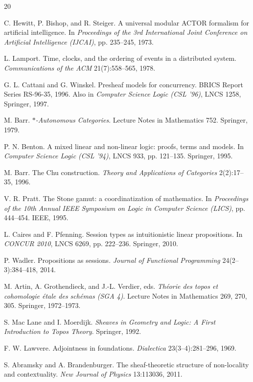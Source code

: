 \documentclass[11pt]{article}
\begin{document}
\begin{thebibliography}{20}
\raggedright

C. Hewitt, P. Bishop, and R. Steiger.
A universal modular ACTOR formalism for artificial intelligence.
In \emph{Proceedings of the 3rd International Joint Conference on Artificial
Intelligence (IJCAI)}, pp. 235--245, 1973.

L. Lamport.
Time, clocks, and the ordering of events in a distributed system.
\emph{Communications of the ACM} 21(7):558--565, 1978.

G. L. Cattani and G. Winskel.
Presheaf models for concurrency.
BRICS Report Series RS-96-35, 1996. Also in
\emph{Computer Science Logic (CSL '96)}, LNCS 1258, Springer, 1997.

M. Barr.
\emph{$*$-Autonomous Categories}.
Lecture Notes in Mathematics 752. Springer, 1979.

P. N. Benton.
A mixed linear and non-linear logic: proofs, terms and models.
In \emph{Computer Science Logic (CSL '94)}, LNCS 933, pp. 121--135. Springer,
1995.

M. Barr.
The Chu construction.
\emph{Theory and Applications of Categories} 2(2):17--35, 1996.

V. R. Pratt.
The Stone gamut: a coordinatization of mathematics.
In \emph{Proceedings of the 10th Annual IEEE Symposium on Logic in Computer
Science (LICS)}, pp. 444--454. IEEE, 1995.

L. Caires and F. Pfenning.
Session types as intuitionistic linear propositions.
In \emph{CONCUR 2010}, LNCS 6269, pp. 222--236. Springer, 2010.

P. Wadler.
Propositions as sessions.
\emph{Journal of Functional Programming} 24(2--3):384--418, 2014.

M. Artin, A. Grothendieck, and J.-L. Verdier, eds.
\emph{Th\'eorie des topos et cohomologie \'etale des sch\'emas (SGA 4)}.
Lecture Notes in Mathematics 269, 270, 305. Springer, 1972--1973.

S. Mac Lane and I. Moerdijk.
\emph{Sheaves in Geometry and Logic: A First Introduction to Topos Theory}.
Springer, 1992.

F. W. Lawvere.
Adjointness in foundations.
\emph{Dialectica} 23(3--4):281--296, 1969.

S. Abramsky and A. Brandenburger.
The sheaf-theoretic structure of non-locality and contextuality.
\emph{New Journal of Physics} 13:113036, 2011.


\end{thebibliography}
\end{document}
